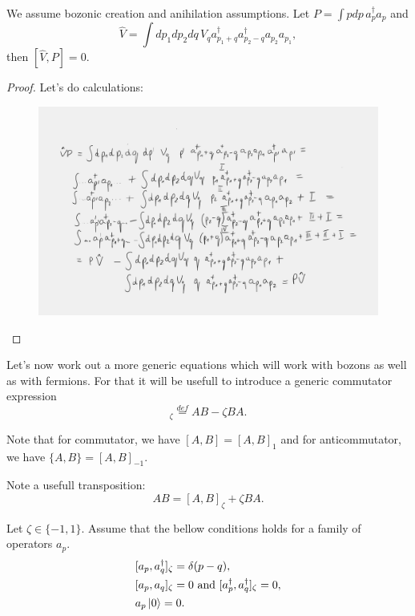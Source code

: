 \documentclass[main.tex]{subfiles}
\begin{document}
\begin{proposition}
We assume bozonic creation and anihilation assumptions. Let $P = \int pdp\, a^\dagger_p a_p$ and
\begin{equation}
\hat{V} = \int dp_1 dp_2 dq\, V_q a^\dagger_{p_1 + q} a^\dagger_{p_2 - q} a_{p_2}a_{p_1}, 
\end{equation}
then $[\hat{V}, P] = 0.$
\end{proposition}
\begin{proof}
Let's do calculations:
\begin{figure}[H]
\includegraphics[width=\textwidth]{figs/two_body_potential}
\end{figure}

\end{proof}

Let's now work out a more generic equations which will work with bozons as well as with fermions. For that it will be usefull to introduce a generic commutator expression
\begin{equation}
[A, B]_{\zeta} \stackrel{def}{=} AB -\zeta BA.
\end{equation}

Note that for commutator, we have $[A, B] = [A, B]_1$ and for anticommutator, we have $\{A, B\} = [A, B]_{-1}$.

Note a usefull transposition:
\begin{equation}
AB = [A, B]_{\zeta} + \zeta BA.
\end{equation}

\begin{assumption}
\label{anihilation-creation-assumptions}
Let $\zeta\in\{-1, 1\}$. Assume that the bellow conditions holds for a family of operators $a_p$.
\begin{align}
& [a_p, a^\dagger_q]_\zeta = \delta(p - q),\\
& [a_p, a_q]_\zeta = 0 \text{ and } [a^\dagger_p, a^\dagger_q]_\zeta = 0,\\
& a_p\ket{0} = 0.
\end{align}
\end{assumption}
\end{document}

